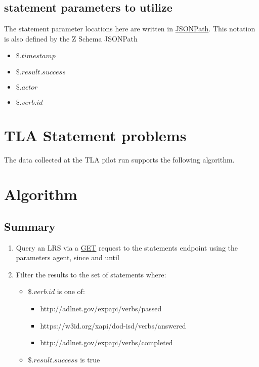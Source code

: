 \documentclass{article}
\begin{document}
\subsection{statement parameters to utilize}
The statement parameter locations here are written in
\href{http://goessner.net/articles/JsonPath/}{JSONPath}. This notation
is also defined by the Z Schema JSONPath
\begin{itemize}
  \item $\$.timestamp$
  \item $\$.result.success$
  \item $\$.actor$
  \item $\$.verb.id$
  \end{itemize}

\section{TLA Statement problems}
The data collected at the TLA pilot run supports the following
algorithm.

\section{Algorithm}

\subsection{Summary}
\begin{enumerate}
  \item Query an LRS via a \href{https://github.com/adlnet/xAPI-Spec/blob/master/xAPI-Communication.md#213-get-statements}{GET} request to the statements endpoint using the parameters agent, since and until
  \item Filter the results to the set of statements where:
    \begin{itemize}
    \item $\$.verb.id$ is one of:
      \begin{itemize}
      \item http://adlnet.gov/expapi/verbs/passed
      \item https://w3id.org/xapi/dod-isd/verbs/answered
      \item http://adlnet.gov/expapi/verbs/completed
      \end{itemize}
    \item $\$.result.success$ is true
    \end{itemize}
  \end{enumerate}
\end{document}
